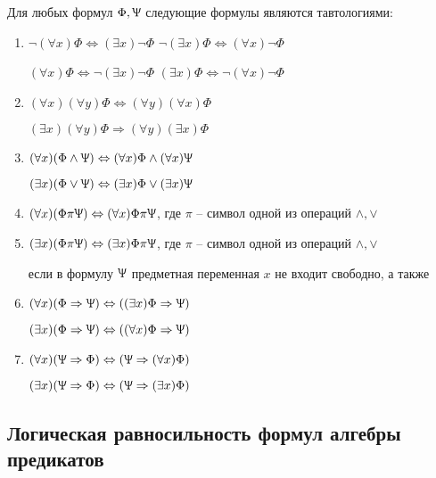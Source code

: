 \begin{lemma}[2]
    Для любых формул $\Phi,\Uppsi$ следующие 
формулы являются тавтологиями:

\begin{enumerate}
    \item $\lnot(\forall x)\Phi \Leftrightarrow (\exists x)\lnot\Phi$ \qquad
    $\lnot(\exists x)\Phi\Leftrightarrow (\forall x)\lnot\Phi$ 

    $(\forall x)\Phi\Leftrightarrow\lnot(\exists x)\lnot\Phi$ \qquad
    $(\exists x)\Phi\Leftrightarrow\lnot(\forall x)\lnot\Phi$


    \item $(\forall x)(\forall y)\Phi\Leftrightarrow(\forall y)(\forall x)\Phi$
    
    $(\exists x)(\forall y)\Phi\Rightarrow(\forall y)(\exists x)\Phi$


    \item $(\forall x)(\Phi\land\Uppsi)\Leftrightarrow(\forall x)\Phi\land(\forall x)\Uppsi$
    
    $(\exists x)(\Phi\lor\Uppsi)\Leftrightarrow(\exists x)\Phi\lor(\exists x)\Uppsi$


    \item $(\forall x)(\Phi \pi \Uppsi)\Leftrightarrow(\forall x)\Phi\pi\Uppsi$, где $\pi$ -- символ одной из операций $\land,\lor$
    
    \item $(\exists x)(\Phi\pi\Uppsi)\Leftrightarrow(\exists x)\Phi\pi\Uppsi$, где $\pi$ -- символ одной из операций $\land,\lor$
    
    если в формулу $\Uppsi$ предметная переменная $x$ не входит свободно, а также

    \item $(\forall x)(\Phi\Rightarrow\Uppsi)\Leftrightarrow((\exists x)\Phi\Rightarrow\Uppsi)$
    
    $(\exists x)(\Phi\Rightarrow\Uppsi)\Leftrightarrow((\forall x)\Phi\Rightarrow\Uppsi)$

    \item $(\forall x)(\Uppsi\Rightarrow\Phi)\Leftrightarrow(\Uppsi\Rightarrow(\forall x)\Phi)$
    
    $(\exists x)(\Uppsi\Rightarrow\Phi)\Leftrightarrow(\Uppsi\Rightarrow(\exists x)\Phi)$

\end{enumerate}

\end{lemma}

\subsection*{Логическая равносильность формул алгебры предикатов}

